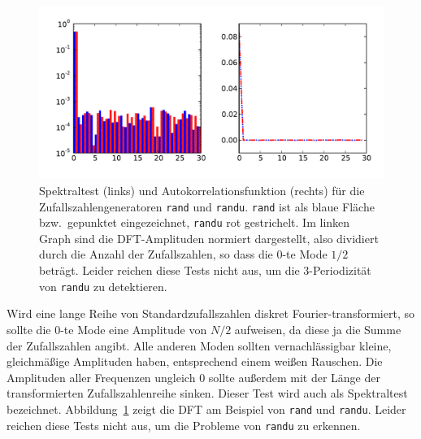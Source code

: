 \subsection{}

\begin{figure}
  \centering
  \includegraphics[width=\textwidth]{plots/fft_tests}
  \caption{Spektraltest (links) und Autokorrelationsfunktion (rechts)
    für die Zufallszahlengeneratoren \texttt{rand} und
    \texttt{randu}. \texttt{rand} ist als blaue Fläche bzw.\ gepunktet
    eingezeichnet, \texttt{randu} rot gestrichelt.  Im linken Graph
    sind die DFT-Amplituden normiert dargestellt, also dividiert durch
    die Anzahl der Zufallszahlen, so dass die 0-te Mode $1/2$
    beträgt. Leider reichen diese Tests nicht aus, um die
    3-Periodizität von \texttt{randu} zu detektieren.}
  \label{fig:fft_tests}
\end{figure}

Wird eine lange Reihe von Standardzufallszahlen diskret
Fourier-transformiert, so sollte die 0-te Mode eine Amplitude von
$N/2$ aufweisen, da diese ja die Summe der Zufallszahlen angibt. Alle
anderen Moden sollten vernachlässigbar kleine, gleichmäßige
Amplituden haben, entsprechend einem weißen Rauschen. Die Amplituden
aller Frequenzen ungleich $0$ sollte außerdem mit der Länge der
transformierten Zufallszahlenreihe sinken. Dieser Test wird auch als
Spektraltest bezeichnet. Abbildung~\ref{fig:fft_tests} zeigt die
DFT am Beispiel von \texttt{rand} und \texttt{randu}. Leider reichen
diese Tests nicht aus, um die Probleme von \texttt{randu} zu erkennen.

\subsection{}

